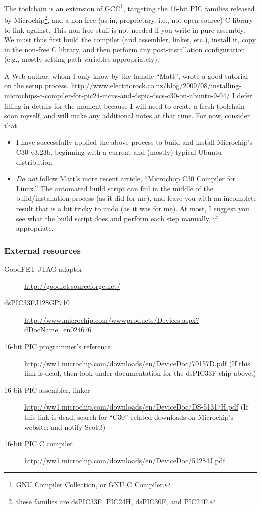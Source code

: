 \documentclass[letterpaper]{article}
\begin{document}
The toolchain is an extension of GCC\footnote{GNU Compiler Collection,
  or GNU C Compiler.}, targeting the 16-bit PIC families released by
Microchip\footnote{these families are dsPIC33F, PIC24H, dsPIC30F, and
  PIC24F.}, and a non-free (as in, proprietary, i.e., not open source)
C library to link against. This non-free stuff is not needed if you
write in pure assembly. We must thus first build the compiler (and
assembler, linker, etc.), install it, copy in the non-free C library,
and then perform any post-installation configuration (e.g., mostly
setting path variables appropriately).

A Web author, whom I only know by the handle ``Matt'', wrote a good
tutorial on the setup process.
\url{http://www.electricrock.co.nz/blog/2009/08/installing-microchips-c-compiler-for-pic24-mcus-and-dspic-dscs-c30-on-ubuntu-9-04/}
I defer filling in details for the moment because I will need to
create a fresh toolchain soon myself, and will make any additional
notes at that time. For now, consider that
\begin{itemize}
\item I have successfully applied the above process to build and
  install Microchip's C30 v3.23b, beginning with a current and
  (mostly) typical Ubuntu distribution.

\item \textit{Do not} follow Matt's more recent article, ``Microchop
  C30 Compiler for Linux.'' The automated build script can fail in the
  middle of the build/installation process (as it did for me), and
  leave you with an incomplete result that is a bit tricky to undo (as
  it was for me). At most, I suggest you see what the build script
  does and perform each step manually, if appropriate.
\end{itemize}

\subsubsection{External resources}
\begin{description}
\item[GoodFET JTAG adaptor] \url{http://goodfet.sourceforge.net/}

\item[dsPIC33FJ128GP710]
  \url{http://www.microchip.com/wwwproducts/Devices.aspx?dDocName=en024676}

\item[16-bit PIC programmer's reference]
  \url{http://ww1.microchip.com/downloads/en/DeviceDoc/70157D.pdf} (If
  this link is dead, then look under documentation for the dsPIC33F
  chip above.)

\item[16-bit PIC assembler, linker]
  \url{http://ww1.microchip.com/downloads/en/DeviceDoc/DS-51317H.pdf}
  (If this link is dead, search for ``C30'' related downloads on
  Microchip's website; and notify Scott!)

\item[16-bit PIC C compiler]
  \url{http://ww1.microchip.com/downloads/en/DeviceDoc/51284J.pdf}
\end{description}
\end{document}
